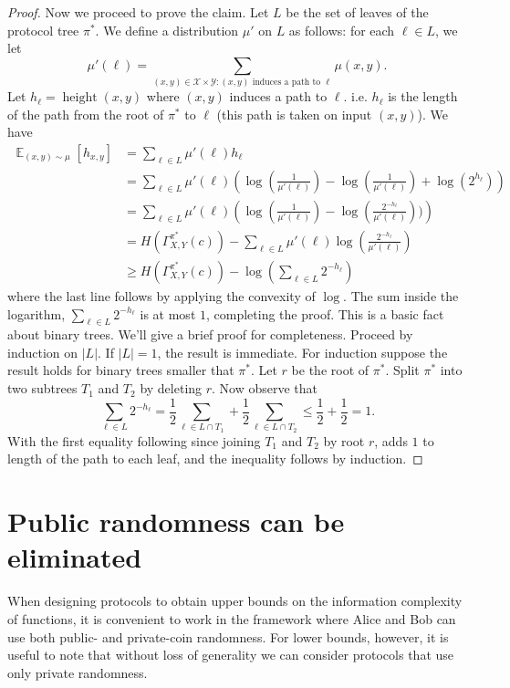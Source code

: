 \documentclass[11pt]{amsart}
\theoremstyle{plain}
\theoremstyle{definition}
\theoremstyle{plain}
\newcommand{\calX}{\mathcal{X}}
\newcommand{\calY}{\mathcal{Y}}
\DeclareMathOperator{\height}{height}
\DeclareMathOperator*{\E}{\mathbb{E}}
\begin{document}
\begin{proof}
Now we proceed to prove the claim. Let $L$ be the set of leaves of the protocol tree $\pi^*$. We define a distribution $\mu'$ on $L$ as follows: for each $\ell \in L$, we let
 $$\mu'(\ell) = \sum_{(x,y) \in \calX\times\calY : (x,y)\text{ induces a path to } \ell} \mu(x,y).$$ 
 Let $h_\ell = \height(x,y)$ where $(x,y)$ induces a path to $\ell$. i.e. $h_\ell$ is the length of the path from the root of $\pi^*$ to $\ell$ (this path is taken on input $(x,y)$). We have
\begin{align*}
\E_{(x,y)\sim \mu}[h_{x,y}] &=\sum_{\ell \in L} \mu'(\ell) h_\ell \\
&=\sum_{\ell \in L} \mu'(\ell)\left(\log(\frac{1}{\mu'(\ell)})-\log(\frac{1}{\mu'(\ell)}) +\log(2^{h_\ell})\right)\\
&=\sum_{\ell\in L} \mu'(\ell)\left(\log(\frac{1}{\mu'(\ell)})-\log(\frac{2^{-h_\ell}}{\mu'(\ell)}))\right) \\
&=H(\Gamma^{\pi^*}_{X,Y}(c)) - \sum_{\ell\in L}\mu'(\ell)\log(\frac{2^{-h_\ell}}{\mu'(\ell)}) \\
&\geq H(\Gamma^{\pi^*}_{X,Y}(c)) - \log(\sum_{\ell\in L} 2^{-h_\ell})
\end{align*}
where the last line follows by applying the convexity of $\log$. The sum inside the logarithm, $\sum_{\ell \in L} 2^{-h_\ell}$ is at most $1$, completing the proof. This is a basic fact about binary trees. We'll give a brief proof for completeness.
Proceed by induction on $|L|$. If $|L| = 1$, the result is immediate. For induction suppose the result holds for binary trees smaller that $\pi^*$. Let $r$ be the root of $\pi^*$. Split $\pi^*$ into two subtrees $T_1$ and $T_2$ by deleting $r$. Now observe that
$$\sum_{\ell \in L} 2^{-h_\ell} = \frac{1}{2}\sum_{\ell \in L \cap T_1} + \frac{1}{2}\sum_{\ell \in L \cap T_2} \leq \frac{1}{2}+\frac{1}{2} = 1.$$
With the first equality following since joining $T_1$ and $T_2$ by root $r$, adds $1$ to length of the path to each leaf, and the inequality follows by induction.
\end{proof}


\newpage 
\section{Public randomness can be eliminated}

When designing protocols to obtain upper bounds on the information complexity of functions, it is convenient to work in the framework where Alice and Bob can use both public- and private-coin randomness. For lower bounds, however, it is useful to note that without loss of generality we can consider protocols that use only private randomness.
\end{document}
